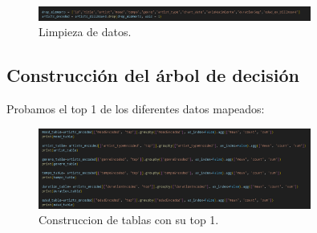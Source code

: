 \documentclass[a4paper,12pt]{article}
\begin{document}
\begin{figure}[H]
    \centering
    \includegraphics[width=0.8\textwidth]{18.png}
    \caption{Limpieza de datos.}
    \label{fig:decision_tree}
\end{figure}

\subsection{Construcción del árbol de decisión}
Probamos el top 1 de los diferentes datos mapeados:

\begin{figure}[H]
    \centering
    \includegraphics[width=0.8\textwidth]{19.png}
    \caption{Construccion de tablas con su top 1.}
    \label{fig:decision_tree}
\end{figure}
\end{document}
